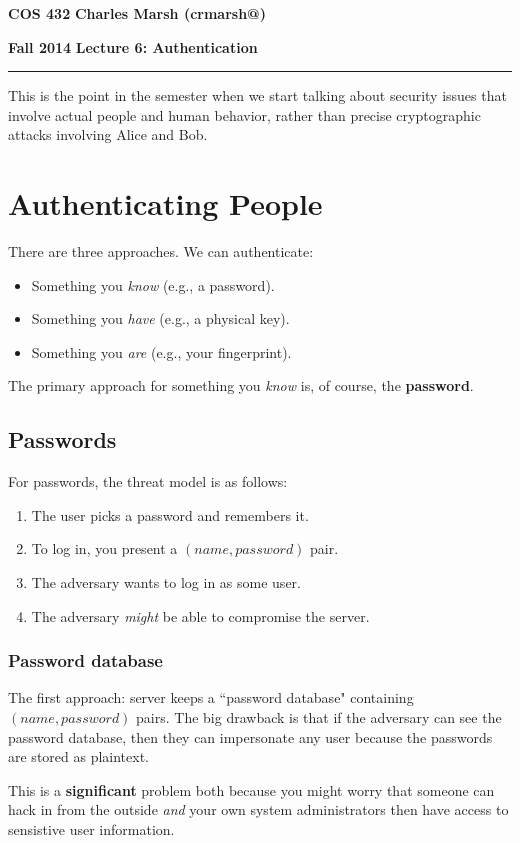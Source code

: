 \documentclass[12pt]{article}
\makeatletter
\newcommand{\myheader}[4]
{\vspace*{-0.5in}
\noindent
{#1} \hfill {#3}

\noindent
{#2} \hfill {#4}

\noindent
\rule[8pt]{\textwidth}{1pt}

\vspace{1ex} 
}  %
\newcommand{\myalgsheader}[0]
{\myheader
{ {\bf{COS 432}} }
{ {\bf{Fall 2014}} }
{ {\bf{Charles Marsh (crmarsh@)}} }
{ {\bf{Lecture 6: Authentication}} }
}
\makeatother
\begin{document}
\myalgsheader

\pagestyle{plain}

This is the point in the semester when we start talking about security issues that involve actual people and human behavior, rather than precise cryptographic attacks involving Alice and Bob.

\section*{Authenticating People}

There are three approaches. We can authenticate:
\begin{itemize}
\item Something you \textit{know} (e.g., a password).
\item Something you \textit{have} (e.g., a physical key).
\item Something you \textit{are} (e.g., your fingerprint).
\end{itemize}

The primary approach for something you \textit{know} is, of course, the \textbf{password}.

\subsection*{Passwords}

For passwords, the threat model is as follows:
\begin{enumerate}
\item The user picks a password and remembers it.
\item To log in, you present a $(name, password)$ pair.
\item The adversary wants to log in as some user.
\item The adversary \textit{might} be able to compromise the server.
\end{enumerate}

\subsubsection*{Password database}

The first approach: server keeps a ``password database" containing $(name, password)$ pairs. The big drawback is that if the adversary can see the password database, then they can impersonate any user because the passwords are stored as plaintext.

This is a \textbf{significant} problem both because you might worry that someone can hack in from the outside \textit{and} your own system administrators then have access to sensistive user information.
\end{document}
